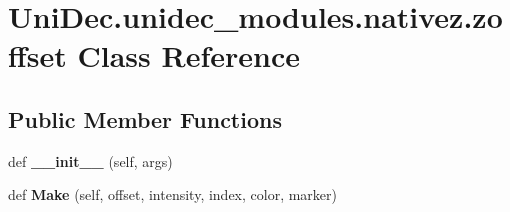 \hypertarget{class_uni_dec_1_1unidec__modules_1_1nativez_1_1zoffset}{}\section{Uni\+Dec.\+unidec\+\_\+modules.\+nativez.\+zoffset Class Reference}
\label{class_uni_dec_1_1unidec__modules_1_1nativez_1_1zoffset}
\subsection*{Public Member Functions}
\begin{DoxyCompactItemize}
\item 
\hypertarget{class_uni_dec_1_1unidec__modules_1_1nativez_1_1zoffset_aa6a21277bfbf1ebd9fe0b0eaabdd5657}{}def {\bfseries \+\_\+\+\_\+init\+\_\+\+\_\+} (self, args)\label{class_uni_dec_1_1unidec__modules_1_1nativez_1_1zoffset_aa6a21277bfbf1ebd9fe0b0eaabdd5657}

\item 
\hypertarget{class_uni_dec_1_1unidec__modules_1_1nativez_1_1zoffset_a9cbc48405dba3dd03b0b429398c757b8}{}def {\bfseries Make} (self, offset, intensity, index, color, marker)\label{class_uni_dec_1_1unidec__modules_1_1nativez_1_1zoffset_a9cbc48405dba3dd03b0b429398c757b8}

\end{DoxyCompactItemize}
